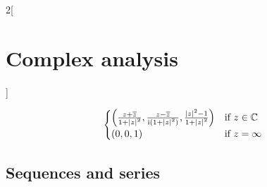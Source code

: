 \documentclass[../../../main.tex]{subfiles}
\begin{document}
\begin{multicols}{2}[\section{Complex analysis}]
\begin{definition}
$$\begin{cases}
        \left(\frac{z+\overline{z}}{1+\abs{z}^2},\frac{z-\overline{z}}{\mathrm{i}(1+{\abs{z}}^2)},\frac{{\abs{z}}^2-1}{1+{\abs{z}}^2}\right) & \text{if }z\in\mathbb{C}  \\
        (0,0,1)                                                                                                                       & \text{if }z=\infty
      \end{cases}$$
  \end{definition}
  \begin{center}
    \begin{minipage}{\linewidth}
      \centering
      
    \end{minipage}
  \end{center}
  \subsection{Sequences and series}

\end{multicols}
\end{document}
